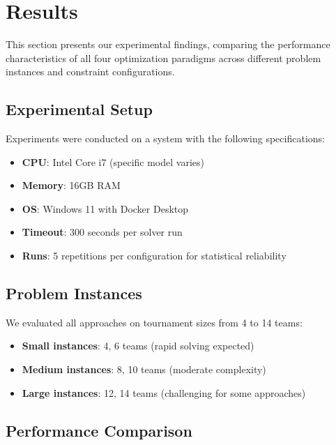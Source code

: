 \documentclass[11pt]{article}
\begin{document}
\section{Results}

This section presents our experimental findings, comparing the performance characteristics of all four optimization paradigms across different problem instances and constraint configurations.

\subsection{Experimental Setup}

Experiments were conducted on a system with the following specifications:
\begin{itemize}
    \item \textbf{CPU}: Intel Core i7 (specific model varies)
    \item \textbf{Memory}: 16GB RAM
    \item \textbf{OS}: Windows 11 with Docker Desktop
    \item \textbf{Timeout}: 300 seconds per solver run
    \item \textbf{Runs}: 5 repetitions per configuration for statistical reliability
\end{itemize}

\subsection{Problem Instances}

We evaluated all approaches on tournament sizes from 4 to 14 teams:
\begin{itemize}
    \item \textbf{Small instances}: 4, 6 teams (rapid solving expected)
    \item \textbf{Medium instances}: 8, 10 teams (moderate complexity)
    \item \textbf{Large instances}: 12, 14 teams (challenging for some approaches)
\end{itemize}

\subsection{Performance Comparison}
\end{document}
